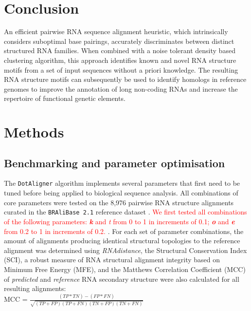 \documentclass{bmcart}
\newcommand\dotaligner{\texttt{DotAligner}}
\newcommand\bralibase{\texttt{BRAliBase 2.1}}
\begin{document}
\section*{Conclusion}
An efficient pairwise RNA sequence alignment heuristic, which intrinsically considers
suboptimal base pairings, accurately discriminates between distinct structured RNA families.
When combined with a noise tolerant density based clustering algorithm, this 
approach identifies known and novel RNA structure motifs from a set of input sequences 
without a priori knowledge. The resulting RNA structure motifs can subsequently 
be used to identify homologs in reference genomes to improve the annotation of 
long non-coding RNAs and increase the repertoire of functional genetic elements. 


\section*{Methods} 
\subsection*{Benchmarking and parameter optimisation}

The \dotaligner{} algorithm implements several parameters that
first need to be tuned before being applied to biological sequence
analysis. All combinations of core parameters were tested on the 8,976
pairwise RNA structure alignments curated in the \bralibase{} reference dataset
\cite{wilm2006enhanced}. \textcolor{red}{We first tested all combinations of the following parameters: \textit{\textbf{k}} and \textit{\textit{t}} from 0 to 1 in increments of 0.1;  \textit{\textbf{o}} and \textbf{\textit{e}} from 0.2 to 1 in increments of 0.2. 
 }. For each set of parameter combinations, the amount of
alignments producing identical structural topologies to the reference alignment
was determined using \textit{RNAdistance}, the Structural Conservation Index
(SCI), a robust measure of RNA structural alignment integrity
\cite{gruber2008strategies} based on Minimum Free Energy (MFE), and the Matthews Correlation Coefficient (MCC) of \textit{predicted} and \textit{reference} RNA secondary structure
were also calculated for all resulting alignments: \\

MCC = $\frac{(TP * TN) - (FP * FN)}{ \sqrt{ (TP + FP)(TP + FN)(TN + FP)(TN + FN) }}$\\
\end{document}
